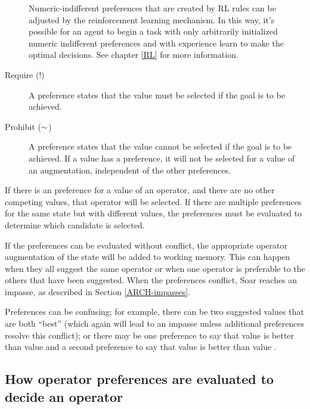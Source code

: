 \begin{description}
	Numeric-indifferent preferences that are created by RL rules can be adjusted
	by the reinforcement learning mechanism. In this way, it's possible for an
	agent to begin a task with only arbitrarily initialized numeric indifferent
	preferences and with experience learn to make the optimal decisions. See
	chapter \ref{RL} for more information.
	
\item [Require (!)] A  preference states that the value must be
        selected if the goal is to be achieved.\vspace{-8pt}

\item [Prohibit ($\sim$)] A  preference states that the value 
cannot
        be selected if the goal is to be achieved.  If a value has a
         preference, it will not be selected for a value of an
        augmentation, independent of the other preferences.\vspace{-8pt}
\end{description}


If there is an
\/ preference for a value of an operator, and there are no
other competing values, that operator will be selected.  If there are
multiple \/ preferences for the same state but with
different values, the preferences must be evaluated to determine which
candidate is selected.

If the preferences can be evaluated without conflict, the appropriate
operator augmentation of the state will be added to working
memory. This can happen when they all suggest the same operator or when
one operator is preferable to the others that have been suggested. When
the preferences conflict, Soar reaches an impasse, as described in
Section \ref{ARCH-impasses}.

Preferences can be confusing; for example, there can be two suggested
values that are both ``best'' (which again will lead to an impasse
unless additional preferences resolve this conflict); or there may be
one preference to say that value  is better than value 
and a second preference to say that value  is better than value
.

\subsection{How operator preferences are evaluated to decide an operator}
\label{PREFERENCES}

